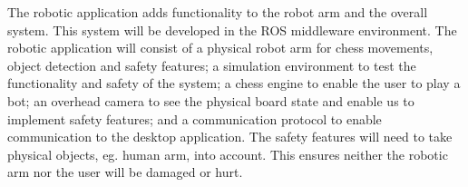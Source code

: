 \documentclass[11pt,fleqn,twoside]{article}
\begin{document}
\noindent The robotic application adds functionality to the robot arm and the overall system. This system will be 
developed in the ROS middleware environment\cite{ros}. The robotic application will consist of a physical robot arm for chess
movements, object detection and safety features; a simulation environment to test the functionality and safety of the 
system; a chess engine to enable the user to play a bot; an overhead camera to see the physical board state and enable us to implement
safety features; and a communication protocol to enable communication to the desktop application. The safety features will need to take 
physical objects, eg. human arm, into account. This ensures neither the robotic arm nor the user will be damaged or hurt.\newline 

\end{document}
